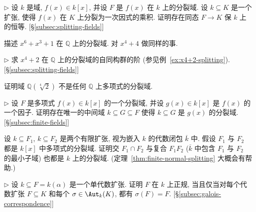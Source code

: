 \begin{prob}\label{ex:splitting-field-hom}
$\triangleright$ 设 $k$ 是域, $f(x)\in k[x]$, 并设 $F$ 是 $f(x)$ 在 $k$ 上的分裂域. 设 $k\subseteq K$ 是一个扩张, 使得 $f(x)$ 在 $K$ 上分裂为一次因式的乘积. 证明存在同态 $F\to K$ 保 $k$ 上的恒等. [§\ref{subsec:splitting-fields}]
\end{prob}

\begin{prob}\label{ex:splitting-x6+x3+1}
描述 $x^6+x^3+1$ 在 $\mathbb{Q}$ 上的分裂域. 对 $x^4+4$ 做同样的事.
\end{prob}

\begin{prob}\label{ex:aut-group-x4+2}
$\triangleright$ 求 $x^4+2$ 在 $\mathbb{Q}$ 上的分裂域的自同构群的阶 (参见例~\ref{ex:x4+2-splitting}). [§\ref{subsec:splitting-fields}]
\end{prob}

\begin{prob}\label{ex:Q-root4-not-splitting}
证明域 $\mathbb{Q}(\sqrt[4]{2})$ 不是任何 $\mathbb{Q}$ 上多项式的分裂域.
\end{prob}

\begin{prob}\label{ex:splitting-of-factor}
$\triangleright$ 设 $F$ 是多项式 $f(x)\in k[x]$ 的一个分裂域, 并设 $g(x)\in k[x]$ 是 $f(x)$ 的一个因子. 证明存在唯一的中间域 $k\subseteq G\subseteq F$ 使得 $k\subseteq G$ 是 $g(x)$ 的分裂域. [\S\ref{subsec:finite-fields}]
\end{prob}

\begin{prob}\label{ex:intersection-composite-splitting}
设 $k\subseteq F_1$, $k\subseteq F_2$ 是两个有限扩张, 视为嵌入 $k$ 的代数闭包 $\overline{k}$ 中. 假设 $F_1$ 与 $F_2$ 都是 $k[x]$ 中多项式的分裂域. 证明交 $F_1\cap F_2$ 与复合 $F_1F_2$ ($\overline{k}$ 中包含 $F_1$ 与 $F_2$ 的最小子域) 也都是 $k$ 上的分裂域. (定理~\ref{thm:finite-normal-splitting} 大概会有帮助.)
\end{prob}

\begin{prob}\label{ex:simple-normal-aut}
$\triangleright$ 设 $k\subseteq F=k(\alpha)$ 是一个单代数扩张. 证明 $F$ 在 $k$ 上正规, 当且仅当对每个代数扩张 $F\subseteq K$ 和每个 $\sigma\in\Aut_k(K)$, 都有 $\sigma(F)=F$. [\S\ref{subsec:galois-correspondence}]
\end{prob}

